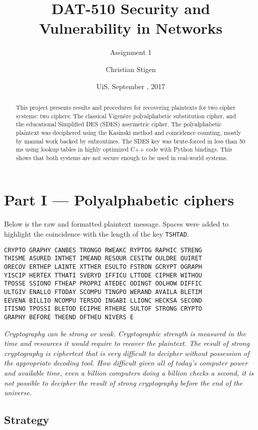 \documentclass[a4paper,english,12pt]{article}
\title{DAT-510 Security and Vulnerability in Networks}
\subtitle{Assignment 1}
\author{Christian Stigen}
\date{UiS, September \nth{18}, 2017}
\begin{document}
\maketitle

\begin{abstract}
This project presents results and procedures for recovering plaintexts for two
  cipher systems: two ciphers: The classical Vigenère polyalphabetic
  substitution cipher, and the educational Simplified DES (SDES) assymetric
  cipher. The polyalphabetic plaintext was deciphered using the Kasinski method
  and coincidence counting, mostly by manual work backed by subroutines.  The
  SDES key was brute-forced in less than 50 ms using lookup tables in highly
  optimized C++ code with Python bindings. This shows that both systems are not
  secure enough to be used in real-world systems.
\end{abstract}

\section{Part I --- Polyalphabetic ciphers}

Below is the raw and formatted plaintext message. Spaces were added to
highlight the coincidence with the length of the key \texttt{TSHTAD}.

\begin{verbatim}
CRYPTO GRAPHY CANBES TRONGO RWEAKC RYPTOG RAPHIC STRENG
THISME ASURED INTHET IMEAND RESOUR CESITW OULDRE QUIRET
ORECOV ERTHEP LAINTE XTTHER ESULTO FSTRON GCRYPT OGRAPH
YISCIP HERTEX TTHATI SVERYD IFFICU LTTODE CIPHER WITHOU
TPOSSE SSIONO FTHEAP PROPRI ATEDEC ODINGT OOLHOW DIFFIC
ULTGIV ENALLO FTODAY SCOMPU TINGPO WERAND AVAILA BLETIM
EEVENA BILLIO NCOMPU TERSDO INGABI LLIONC HECKSA SECOND
ITISNO TPOSSI BLETOD ECIPHE RTHERE SULTOF STRONG CRYPTO
GRAPHY BEFORE THEEND OFTHEU NIVERS E
\end{verbatim}

\textit{Cryptography can be strong or weak. Cryptographic strength is measured
in the time and resources it would require to recover the plaintext.  The
result of strong cryptography is ciphertext that is very difficult to decipher
without possession of the appropriate decoding tool. How difficult given all of
today's computer power and available time, even a billion computers doing a
billion checks a second, it is not possible to decipher the result of strong
cryptography before the end of the universe.}

\subsection{Strategy}
\end{document}
